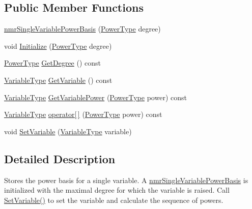 \subsection*{Public Member Functions}
\begin{DoxyCompactItemize}
\item 
\hyperlink{classnmr_single_variable_power_basis_a56ba4788253350a1c3bf81d945011fb4}{nmr\+Single\+Variable\+Power\+Basis} (\hyperlink{classnmr_single_variable_power_basis_ae580b034e01160a9fc39455a9356730f}{Power\+Type} degree)
\item 
void \hyperlink{classnmr_single_variable_power_basis_a6e5e7f3f5bc667cd5fa20670edc9526a}{Initialize} (\hyperlink{classnmr_single_variable_power_basis_ae580b034e01160a9fc39455a9356730f}{Power\+Type} degree)
\item 
\hyperlink{classnmr_single_variable_power_basis_ae580b034e01160a9fc39455a9356730f}{Power\+Type} \hyperlink{classnmr_single_variable_power_basis_a90634b2343f121f78377a16780632fc8}{Get\+Degree} () const 
\item 
\hyperlink{classnmr_single_variable_power_basis_a4500df2ac423b7a55c32183275b2d7a2}{Variable\+Type} \hyperlink{classnmr_single_variable_power_basis_a9b70d9d391784fadd7ff343a68dc8327}{Get\+Variable} () const 
\item 
\hyperlink{classnmr_single_variable_power_basis_a4500df2ac423b7a55c32183275b2d7a2}{Variable\+Type} \hyperlink{classnmr_single_variable_power_basis_a91e5ce5da8ae59cf0016509bd03ef576}{Get\+Variable\+Power} (\hyperlink{classnmr_single_variable_power_basis_ae580b034e01160a9fc39455a9356730f}{Power\+Type} power) const 
\item 
\hyperlink{classnmr_single_variable_power_basis_a4500df2ac423b7a55c32183275b2d7a2}{Variable\+Type} \hyperlink{classnmr_single_variable_power_basis_a30ba3a85cf29345765e32c8ad2162328}{operator\mbox{[}$\,$\mbox{]}} (\hyperlink{classnmr_single_variable_power_basis_ae580b034e01160a9fc39455a9356730f}{Power\+Type} power) const 
\item 
void \hyperlink{classnmr_single_variable_power_basis_ac4b1f67349ee8aae11b5500efae311c2}{Set\+Variable} (\hyperlink{classnmr_single_variable_power_basis_a4500df2ac423b7a55c32183275b2d7a2}{Variable\+Type} variable)
\end{DoxyCompactItemize}


\subsection{Detailed Description}
Stores the power basis for a single variable. A \hyperlink{classnmr_single_variable_power_basis}{nmr\+Single\+Variable\+Power\+Basis} is initialized with the maximal degree for which the variable is raised. Call \hyperlink{classnmr_single_variable_power_basis_ac4b1f67349ee8aae11b5500efae311c2}{Set\+Variable()} to set the variable and calculate the sequence of powers. 

